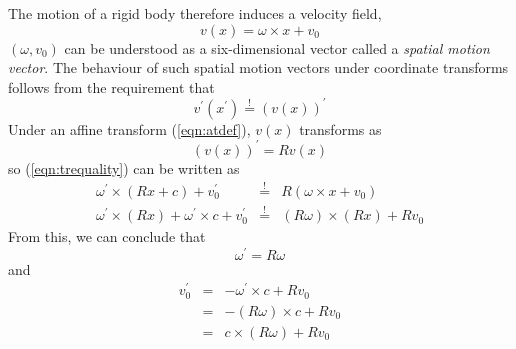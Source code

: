 \documentclass[a4paper]{article}
\begin{document}
The motion of a rigid body therefore induces a velocity field,
\begin{equation}
v(x) = \omega \times x + v_0
\end{equation}
$(\omega, v_0)$ can be understood as a six-dimensional vector called a \textit{spatial motion vector}. The behaviour of such spatial motion vectors under coordinate transforms follows from the requirement that
\begin{equation}
\label{eqn:trequality}
v^\prime(x^\prime) \stackrel{!}{=} (v(x))^\prime
\end{equation}
Under an affine transform (\ref{eqn:atdef}), $v(x)$ transforms as
\begin{equation}
(v(x))^\prime = R v(x)
\end{equation}
so (\ref{eqn:trequality}) can be written as
\begin{eqnarray}
\omega^\prime \times (Rx + c) + v_0^\prime &\stackrel{!}{=}& R(\omega \times x + v_0)\\
\omega^\prime \times (Rx) + \omega^\prime \times c + v_0^\prime
&\stackrel{!}{=}& (R\omega) \times (Rx) + R v_0
\end{eqnarray}
From this, we can conclude that
\begin{equation}
\omega^\prime = R \omega
\end{equation}
and
\begin{eqnarray}
\nonumber v_0^\prime &=& - \omega^\prime \times c + R v_0\\
\nonumber &=& - (R \omega) \times c + R v_0\\
&=& c \times (R \omega) + R v_0
\end{eqnarray}
\end{document}
